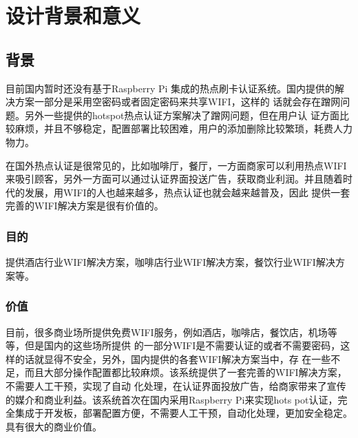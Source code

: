 \chapter{设计背景和意义}

\section{背景}
目前国内暂时还没有基于Raspberry Pi
集成的热点刷卡认证系统。国内提供的解决方案一部分是采用空密码或者固定密码来共享WIFI，这样的
话就会存在蹭网问题。另外一些提供的hotspot热点认证方案解决了蹭网问题，但在用户认
证方面比较麻烦，并且不够稳定，配置部署比较困难，用户的添加删除比较繁琐，耗费人力物力。

在国外热点认证是很常见的，比如咖啡厅，餐厅，一方面商家可以利用热点WIFI来吸引顾客，另外一方面可以通过认证界面投送广告，获取商业利润。并且随着时代的发展，用WIFI的人也越来越多，热点认证也就会越来越普及，因此
提供一套完善的WIFI解决方案是很有价值的。

\subsection{目的}
提供酒店行业WIFI解决方案，咖啡店行业WIFI解决方案，餐饮行业WIFI解决方案等。

\subsection{价值}
目前，很多商业场所提供免费WIFI服务，例如酒店，咖啡店，餐饮店，机场等等，但是国内的这些场所提供
的一部分WIFI是不需要认证的或者不需要密码，这样的话就显得不安全，另外，国内提供的各套WIFI解决方案当中，存
在一些不足，而且大部分操作配置都比较麻烦。该系统提供了一套完善的WIFI解决方案，不需要人工干预，实现了自动
化处理，在认证界面投放广告，给商家带来了宣传的媒介和商业利益。该系统首次在国内采用Raspberry Pi来实现hots
pot认证，完全集成于开发板，部署配置方便，不需要人工干预，自动化处理，更加安全稳定。具有很大的商业价值。


